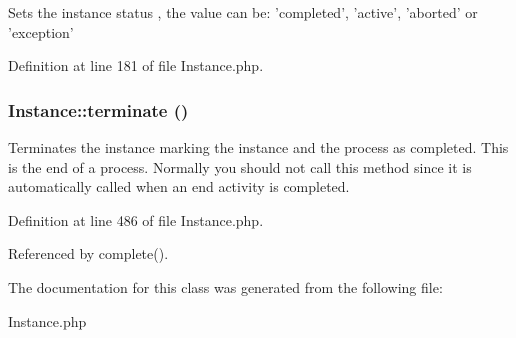 Sets the instance status , the value can be: 'completed', 'active', 'aborted' or 'exception' 

Definition at line 181 of file Instance.php.
\subsubsection{\setlength{\rightskip}{0pt plus 5cm}Instance::terminate ()}\label{classInstance_a24}


Terminates the instance marking the instance and the process as completed. This is the end of a process. Normally you should not call this method since it is automatically called when an end activity is completed. 

Definition at line 486 of file Instance.php.

Referenced by complete().

The documentation for this class was generated from the following file:\begin{CompactItemize}
\item 
Instance.php\end{CompactItemize}
